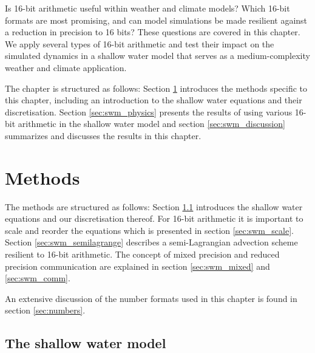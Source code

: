Is 16-bit arithmetic useful within weather and climate models? Which 16-bit formats are most promising, and can model
simulations be made resilient against a reduction in precision to 16 bits? These questions are covered in this chapter.
We apply several types of 16-bit arithmetic and test their impact on the simulated dynamics in a shallow water model that
serves as a medium-complexity weather and climate application.

The chapter is structured as follows: Section \ref{sec:swm_methods} introduces the methods specific to this chapter, including
an introduction to the shallow water equations and their discretisation. Section \ref{sec:swm_physics} presents the results of
using various 16-bit arithmetic in the shallow water model and section \ref{sec:swm_discussion} summarizes and discusses
the results in this chapter.

\section{Methods}
\label{sec:swm_methods}

The methods are structured as follows: Section \ref{sec:swm_swm} introduces the shallow water equations and our
discretisation thereof. For 16-bit arithmetic it is important to scale and reorder the equations which is presented in 
section \ref{sec:swm_scale}. Section \ref{sec:swm_semilagrange} describes a semi-Lagrangian advection scheme
resilient to 16-bit arithmetic. The concept of mixed precision and reduced precision communication are explained
in section \ref{sec:swm_mixed} and \ref{sec:swm_comm}.

An extensive discussion of the number formats used in this chapter is found in section \ref{sec:numbers}.

\subsection{The shallow water model}
\label{sec:swm_swm}

